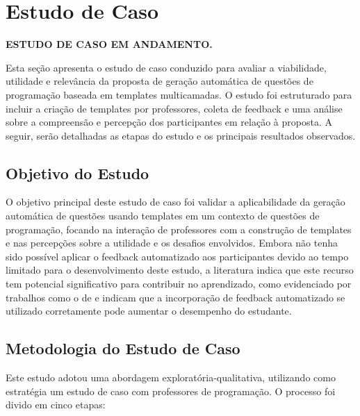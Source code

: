 \chapter{Estudo de Caso}

\textbf{ESTUDO DE CASO EM ANDAMENTO.}

Esta seção apresenta o estudo de caso conduzido para avaliar a viabilidade, utilidade e relevância da proposta de geração automática de questões de programação baseada em templates multicamadas. O estudo foi estruturado para incluir a criação de templates por professores, coleta de feedback e uma análise sobre a compreensão e percepção dos participantes em relação à proposta. A seguir,  serão detalhadas as etapas do estudo e os principais resultados observados. 

\section{Objetivo do Estudo}
O objetivo principal deste estudo de caso foi validar a aplicabilidade da geração automática de questões usando templates em um contexto de questões de programação, focando na interação de professores com a construção de templates e nas percepções sobre a utilidade e os desafios envolvidos. Embora não tenha sido possível aplicar o feedback automatizado aos participantes devido ao tempo limitado para o desenvolvimento deste estudo, a literatura  indica que este recurso tem potencial significativo para contribuir no aprendizado, como evidenciado por trabalhos como o de \parencite{vanpraet2024} e \parencite{fung2024} indicam que a incorporação de feedback automatizado se utilizado corretamente pode aumentar o desempenho do estudante.


\section{Metodologia do Estudo de Caso}

Este estudo adotou uma abordagem exploratória-qualitativa, utilizando como  estratégia um estudo de caso com professores de programação. O processo foi divido em cinco etapas:  

